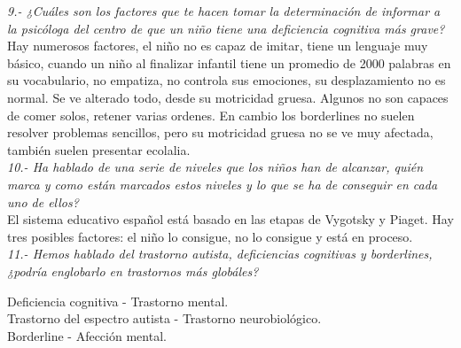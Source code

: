 \documentclass[letterpaper,12pt]{article}
\begin{document}
\textit{9.- ¿Cuáles son los factores que te hacen tomar la determinación de
informar a la psicóloga del centro de que un niño tiene una deficiencia
cognitiva más grave?} \\

Hay numerosos factores, el niño no es capaz de imitar, tiene un lenguaje
muy básico, cuando un niño al finalizar infantil tiene un promedio de 2000
palabras en su vocabulario, no empatiza, no controla sus emociones, su desplazamiento no es normal.
Se ve alterado todo, desde su motricidad gruesa. Algunos no son capaces
de comer solos, retener varias ordenes.
En cambio los borderlines no suelen resolver problemas sencillos, pero su
motricidad gruesa no se ve muy afectada, también suelen presentar ecolalia. \\

\textit{10.- Ha hablado de una serie de niveles que los niños han de alcanzar,
quién marca y como están marcados estos niveles y lo que se ha de
conseguir en cada uno de ellos?} \\

El sistema educativo español está basado en las etapas de Vygotsky y
Piaget. Hay tres posibles factores: el niño lo consigue, no lo consigue y está
en proceso. \\

\textit{11.- Hemos hablado del trastorno autista, deficiencias cognitivas y
borderlines, ¿podría englobarlo en trastornos más globáles?} \\

\begin{flushleft}
Deficiencia cognitiva - Trastorno mental.\\
Trastorno del espectro autista - Trastorno neurobiológico.\\
Borderline - Afección mental.\\
\end{flushleft}
\end{document}
